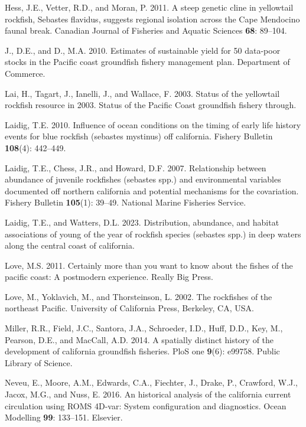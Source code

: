 \documentclass[
]{scrartcl}
\newlength{\cslhangindent}
\newenvironment{CSLReferences}[2] %
 {\begin{list}{}{%
  \setlength{\itemindent}{0pt}
  \setlength{\leftmargin}{0pt}
  \setlength{\parsep}{0pt}
  \ifodd #1
   \setlength{\leftmargin}{\cslhangindent}
   \setlength{\itemindent}{-1\cslhangindent}
  \fi
  \setlength{\itemsep}{#2\baselineskip}}}
 {\end{list}}
\begin{document}
\begin{CSLReferences}{1}{0}
Hess, J.E., Vetter, R.D., and Moran, P. 2011. {A steep genetic cline in
yellowtail rockfish, Sebastes flavidus, suggests regional isolation
across the Cape Mendocino faunal break}. Canadian Journal of Fisheries
and Aquatic Sciences \textbf{68}: 89--104.

J., D.E., and D., M.A. 2010. {Estimates of sustainable yield for 50
data-poor stocks in the Pacific coast groundfish fishery management
plan}. Department of Commerce.

Lai, H., Tagart, J., Ianelli, J., and Wallace, F. 2003. Status of the
yellowtail rockfish resource in 2003. Status of the Pacific Coast
groundfish fishery through.

Laidig, T.E. 2010. Influence of ocean conditions on the timing of early
life history events for blue rockfish (sebastes mystinus) off
california. Fishery Bulletin \textbf{108}(4): 442--449.

Laidig, T.E., Chess, J.R., and Howard, D.F. 2007. Relationship between
abundance of juvenile rockfishes (sebastes spp.) and environmental
variables documented off northern california and potential mechanisms
for the covariation. Fishery Bulletin \textbf{105}(1): 39--49. National
Marine Fisheries Service.

Laidig, T.E., and Watters, D.L. 2023. Distribution, abundance, and
habitat associations of young of the year of rockfish species (sebastes
spp.) in deep waters along the central coast of california.

Love, M.S. 2011. Certainly more than you want to know about the fishes
of the pacific coast: A postmodern experience. Really Big Press.

Love, M., Yoklavich, M., and Thorsteinson, L. 2002. {The rockfishes of
the northeast Pacific}. University of California Press, Berkeley, CA,
USA.

Miller, R.R., Field, J.C., Santora, J.A., Schroeder, I.D., Huff, D.D.,
Key, M., Pearson, D.E., and MacCall, A.D. 2014. A spatially distinct
history of the development of california groundfish fisheries. PloS one
\textbf{9}(6): e99758. Public Library of Science.

Neveu, E., Moore, A.M., Edwards, C.A., Fiechter, J., Drake, P.,
Crawford, W.J., Jacox, M.G., and Nuss, E. 2016. An historical analysis
of the california current circulation using ROMS 4D-var: System
configuration and diagnostics. Ocean Modelling \textbf{99}: 133--151.
Elsevier.


\end{CSLReferences}
\end{document}

